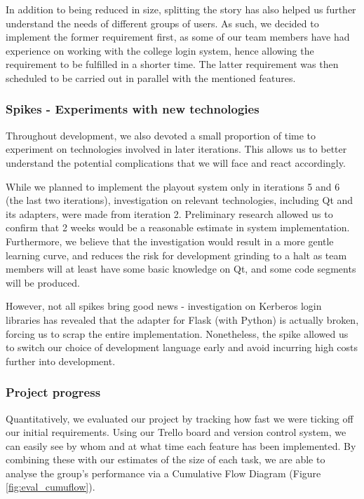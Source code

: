 \documentclass[a4paper, titlepage]{article}
\begin{document}
In addition to being reduced in size, splitting the story has also helped us further understand the needs of different groups of users. As such, we decided to implement the former requirement first, as some of our team members have had experience on working with the college login system, hence allowing the requirement to be fulfilled in a shorter time. The latter requirement was then scheduled to be carried out in parallel with the mentioned features.

\subsubsection{Spikes - Experiments with new technologies}

Throughout development, we also devoted a small proportion of time to experiment on technologies involved in later iterations. This allows us to better understand the potential complications that we will face and react accordingly.

While we planned to implement the playout system only in iterations 5 and 6 (the last two iterations), investigation on relevant technologies, including Qt and its adapters, were made from iteration 2. Preliminary research allowed us to confirm that 2 weeks would be a reasonable estimate in system implementation. Furthermore, we believe that the investigation would result in a more gentle learning curve, and reduces the risk for development grinding to a halt as team members will at least have some basic knowledge on Qt, and some code segments will be produced.

However, not all spikes bring good news - investigation on Kerberos login libraries has revealed that the adapter for Flask (with Python) is actually broken, forcing us to scrap the entire implementation. Nonetheless, the spike allowed us to switch our choice of development language early and avoid incurring high costs further into development.

\subsubsection{Project progress}
	
Quantitatively, we evaluated our project by tracking how fast we were ticking off our initial requirements. Using our Trello board and version control system, we can easily see by whom and at what time each feature has been implemented. By combining these with our estimates of the size of each task, we are able to analyse the group's performance via a Cumulative Flow Diagram (Figure \ref{fig:eval_cumuflow}).
\end{document}

